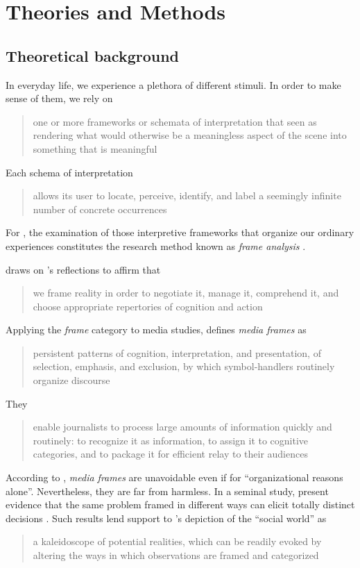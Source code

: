 \chapter{Theories and Methods}

\section{Theoretical background}

In everyday life, we experience a plethora of different stimuli. In order to make sense of them, we rely on \blockcquote[21]{goffman1986frame}[.]{one or more frameworks or schemata of interpretation \textelp{} that  seen as rendering what would otherwise be a meaningless aspect of the scene into something that is meaningful} Each schema of interpretation \blockcquote[21]{goffman1986frame}[.]{allows its user to locate, perceive, identify, and label a seemingly infinite number of concrete occurrences \textelp{}} For \citeauthor{goffman1986frame}, the examination of those interpretive frameworks that organize our ordinary experiences constitutes the research method known as \emph{frame analysis} \autocite[11]{goffman1986frame}.

\citeauthor{gitlin1980whole} draws on \citeauthor{goffman1986frame}'s reflections to affirm that \blockcquote[6--7]{gitlin1980whole}[.]{we frame reality in order to negotiate it, manage it, comprehend it, and choose appropriate repertories of cognition and action} Applying the \emph{frame} category to media studies, \citeauthor{gitlin1980whole} defines \emph{media frames} as \blockcquote[7]{gitlin1980whole}[.]{persistent patterns of cognition, interpretation, and presentation, of selection, emphasis, and exclusion, by which symbol-handlers routinely organize discourse} They \blockcquote[7]{gitlin1980whole}[.]{enable journalists to process large amounts of information quickly and routinely: to recognize it as information, to assign it to cognitive categories, and to package it for efficient relay to their audiences}

According to \citeauthor{gitlin1980whole}, \emph{media frames} are unavoidable even if for \enquote{organizational reasons alone}. Nevertheless, they are far from harmless. In a seminal study, \citeauthor{tversky1981framing} present evidence that the same problem framed in different ways can elicit totally distinct decisions \autocite{tversky1981framing}. Such results lend support to \citeauthor{edelman1993contestable}'s depiction of the \enquote{social world} as \blockcquote{edelman1993contestable}[.]{a kaleidoscope of potential realities, which can be readily evoked by altering the ways in which observations are framed and categorized}


